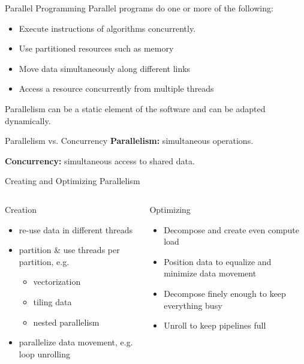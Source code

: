 \documentclass{beamer}
\begin{document}
\begin{frame}{Parallel Programming}
Parallel programs do one or more of the following:

\begin{itemize}
\item Execute instructions of algorithms concurrently. 
\item Use partitioned resources such as memory
\item Move data simultaneously along different links
\item Access a resource concurrently from multiple threads 
\end{itemize}

Parallelism can be a static element of the software and can be adapted dynamically.

\begin{alertblock}{Parallelism vs. Concurrency}
{\bf Parallelism:} simultaneous operations.

{\bf Concurrency:} simultaneous access to shared data.
\end{alertblock}

\end{frame}




\begin{frame}{Creating and Optimizing Parallelism}
\begin{columns}[t]
\begin{block}{Creation}
\begin{itemize}
\item re-use data in different threads
\item partition \& use threads per partition, e.g.
\begin{itemize}
    \item vectorization
    \item tiling data
    \item nested parallelism
\end{itemize}   
\item parallelize data movement, e.g. loop unrolling
\end{itemize}
\end{block}

\begin{block}{Optimizing}
\begin{itemize}
    \item Decompose and create even compute load
    \item Position data to equalize and minimize data movement
    \item Decompose finely enough to keep everything busy
    \item Unroll to keep pipelines full
\end{itemize}
\end{block}
\end{columns}
\end{frame}
\end{document}
